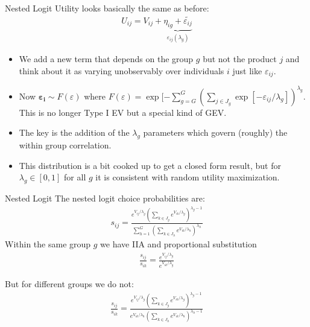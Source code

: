 \documentclass[aspectratio=169,11pt]{beamer}
\begin{document}
\begin{frame}{Nested Logit}
Utility looks basically the same as before:
\begin{eqnarray*}
U_{ij} = V_{ij} + \underbrace{\eta_{ig} + \widetilde{\varepsilon_{ij}}}_{\varepsilon_{ij}(\lambda_g)}
\end{eqnarray*}
\begin{itemize}
\item We add a new term that depends on the group $g$ but not the product $j$ and think about it as varying unobservably over individuals $i$ just like $\varepsilon_{ij}$.
\item Now $\boldsymbol{\varepsilon_i} \sim F(\varepsilon)$ where $F(\varepsilon) = \exp[-\sum_{g=G}^G \left(\sum_{j \in J_g} \exp[-\varepsilon_{ij}/\lambda_g]\right)^{\lambda_g}$. This is no longer Type I EV but a special kind of GEV.
\item The key is the addition of the $\lambda_g$ parameters which govern (roughly) the within group correlation.
\item This distribution is a bit cooked up to get a closed form result, but for $\lambda_g \in [0,1]$ for all $g$ it is consistent with random utility maximization.
\end{itemize}
\end{frame}

\begin{frame}{Nested Logit}
\small
The nested logit choice probabilities are:
\begin{eqnarray*}
s_{ij} = \frac{ e^{V_{ij}/\lambda_g} \left(\sum_{k \in J_g} e^{V_{ik}/\lambda_g} \right)^{\lambda_g -1}}{\sum_{h=1}^G \left(\sum_{k \in J_h} e^{V_{ik}/\lambda_h} \right)^{\lambda_h}}
\end{eqnarray*}
Within the same group $g$ we have IIA and proportional substitution
\begin{eqnarray*}
\frac{s_{ij}}{s_{ik}} = \frac{ e^{V_{ij}/\lambda_g}}{ e^{V_{ik}/\lambda_g}}
\end{eqnarray*}

But for different groups we do not:
\begin{eqnarray*}
\frac{s_{ij}}{s_{ik}} = \frac{ e^{V_{ij}/\lambda_g} \left(\sum_{k \in J_g} e^{V_{ik}/\lambda_g} \right)^{\lambda_g -1}}{ e^{V_{ik}/\lambda_h} \left(\sum_{k \in J_h} e^{V_{ik}/\lambda_h} \right)^{\lambda_h -1}}
\end{eqnarray*}
\end{frame}
\end{document}
